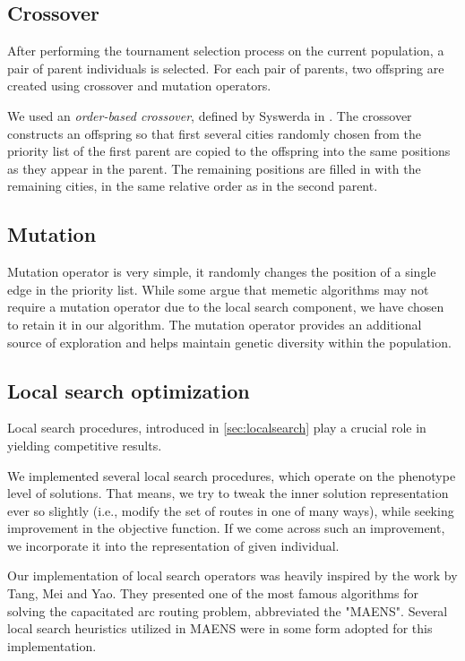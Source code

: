 \documentclass[twoside]{ctuthesis}
\theoremstyle{plain}
\theoremstyle{definition}
\theoremstyle{note}
\begin{document}
\subsection{Crossover}
After performing the tournament selection process on the current population, a pair of parent individuals is selected. For each pair of parents, two offspring are created using crossover and mutation operators. 

We used an \emph{order-based crossover}, defined by Syswerda in \cite{syswerda1991schedule}. The crossover constructs an offspring so that first several cities randomly chosen from the priority list of the first parent are copied to the offspring into the same positions as they appear in the parent. The remaining positions are filled in with the remaining cities, in the same relative order as in the second parent.

\subsection{Mutation}
Mutation operator is very simple, it randomly changes the position of a single edge in the priority list. While some argue that memetic algorithms may not require a mutation operator due to the local search component, we have chosen to retain it in our algorithm. The mutation operator provides an additional source of exploration and helps maintain genetic diversity within the population.

\subsection{Local search optimization}
\label{sec:localsearchcarp}
Local search procedures, introduced in \ref{sec:localsearch} play a crucial role in yielding competitive results.

We implemented several local search procedures, which operate on the phenotype level of solutions. That means, we try to tweak the inner solution representation ever so slightly (i.e., modify the set of routes in one of many ways), while seeking improvement in the objective function. If we come across such an improvement, we incorporate it into the representation of given individual.

Our implementation of local search operators was heavily inspired by the work \cite{tang2009memetic} by Tang, Mei and Yao. They presented one of the most famous algorithms for solving the capacitated arc routing problem, abbreviated the "MAENS". Several local search heuristics utilized in MAENS were in some form adopted for this implementation.
\end{document}
